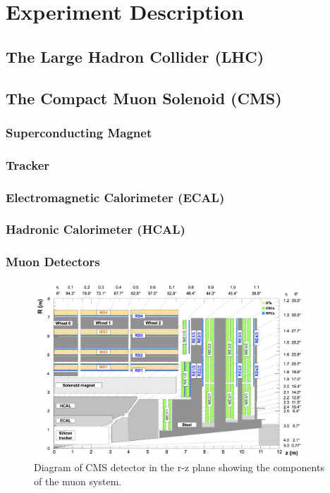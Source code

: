 \chapter{Experiment Description}

\section{The Large Hadron Collider (LHC)}

\section{The Compact Muon Solenoid (CMS)}

\subsection{Superconducting Magnet}

\subsection{Tracker}

\subsection{Electromagnetic Calorimeter (ECAL)}

\subsection{Hadronic Calorimeter (HCAL)}

\subsection{Muon Detectors}

\begin{figure}
  \centering
   \includegraphics[width=0.9\textwidth]{fig/experiment/detector/muon_sys_r-z.png}
	\caption{Diagram of CMS detector in the r-z plane showing the components of the muon system.}
\end{figure}

